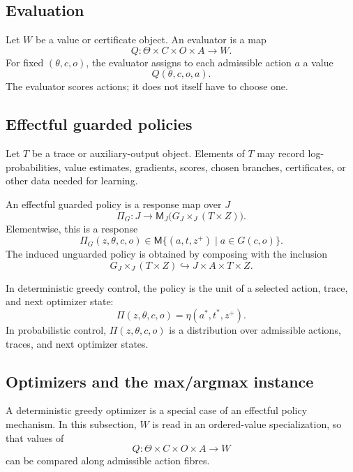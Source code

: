 \subsection{Evaluation}
\label{subsec:effectful-evaluation}

Let \(W\) be a value or certificate object.  An evaluator is a map
\[
Q:\Theta\times C\times O\times A\longrightarrow W.
\]
For fixed \((\theta,c,o)\), the evaluator assigns to each admissible action \(a\) a value
\[
Q(\theta,c,o,a).
\]
The evaluator scores actions; it does not itself have to choose one.

\subsection{Effectful guarded policies}
\label{subsec:effectful-policies}

Let \(T\) be a trace or auxiliary-output object.  Elements of \(T\) may record log-probabilities,
value estimates, gradients, scores, chosen branches, certificates, or other data needed for
learning.

\begin{definition}
\label{def:effectful-guarded-policy}
An effectful guarded policy is a response map over \(J\)
\[
\Pi_G:
J\longrightarrow
\mathsf M_J\bigl(G_J\times_J(T\times Z)\bigr).
\]
Elementwise, this is a response
\[
\Pi_G(z,\theta,c,o)
\in
\mathsf M\{(a,t,z^+)\mid a\in G(c,o)\}.
\]
The induced unguarded policy is obtained by composing with the inclusion
\[
G_J\times_J(T\times Z)
\hookrightarrow
J\times A\times T\times Z.
\]
\end{definition}

In deterministic greedy control, the policy is the unit of a selected action, trace, and next
optimizer state:
\[
\Pi(z,\theta,c,o)
=
\eta(a^\ast,t^\ast,z^+).
\]
In probabilistic control, \(\Pi(z,\theta,c,o)\) is a distribution over admissible actions, traces,
and next optimizer states.

\subsection{Optimizers and the max/argmax instance}
\label{subsec:effectful-optimizers}

A deterministic greedy optimizer is a special case of an effectful policy mechanism.  In this
subsection, \(W\) is read in an ordered-value specialization, so that values of
\[
Q:\Theta\times C\times O\times A\to W
\]
can be compared along admissible action fibres.

